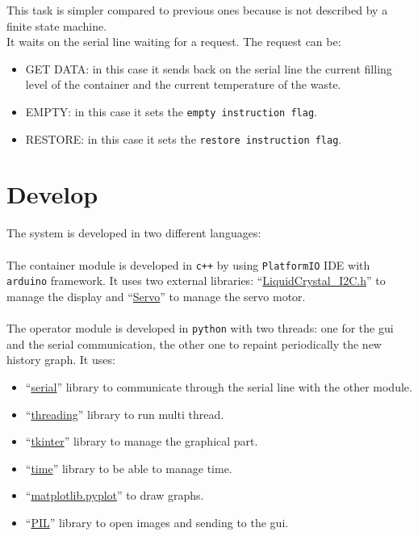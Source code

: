 \documentclass[a4paper,12pt]{report}
\begin{document}
            This task is simpler compared to previous ones because is not described by a finite state machine.\\
            It waits on the serial line waiting for a request. The request can be:
            \begin{itemize}
                \item GET DATA: in this case it sends back on the serial line the current filling level of the container and the current temperature of the waste.
                \item EMPTY: in this case it sets the \texttt{empty instruction flag}.
                \item RESTORE: in this case it sets the \texttt{restore instruction flag}.
            \end{itemize}

\chapter{Develop}

    The system is developed in two different languages:\\\\
    The container module is developed in \texttt{c++} by using \texttt{PlatformIO} IDE with \texttt{arduino} framework. It uses two external libraries: ``\href{https://github.com/johnrickman/LiquidCrystal_I2C}{LiquidCrystal\_I2C.h}'' to manage the display and ``\href{https://docs.arduino.cc/libraries/servo/}{Servo}'' to manage the servo motor.\\\\
    The operator module is developed in \texttt{python} with two threads: one for the gui and the serial communication, the other one to repaint periodically the new history graph. It uses:
    \begin{itemize}
        \item ``\href{https://pyserial.readthedocs.io/en/latest/pyserial.html}{serial}'' library to communicate through the serial line with the other module.
        \item ``\href{https://docs.python.org/3/library/threading.html}{threading}'' library to run multi thread.
        \item ``\href{https://docs.python.org/3/library/tkinter.html}{tkinter}'' library to manage the graphical part.
        \item ``\href{https://docs.python.org/3/library/time.html}{time}'' library to be able to manage time.
        \item ``\href{https://matplotlib.org/3.5.3/api/_as_gen/matplotlib.pyplot.html}{matplotlib.pyplot}'' to draw graphs.
        \item ``\href{https://pillow.readthedocs.io/en/stable/}{PIL}'' library to open images and sending to the gui.
    \end{itemize}
\end{document}
